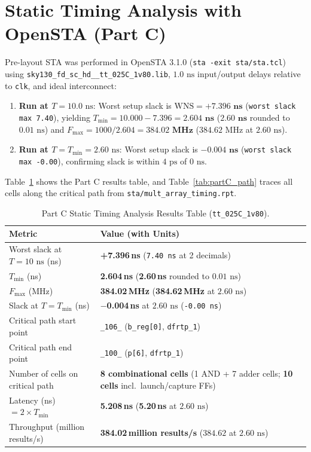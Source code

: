\documentclass[conference,10pt]{IEEEtran}
\begin{document}
\section{Static Timing Analysis with OpenSTA (Part C)}
Pre-layout STA was performed in OpenSTA 3.1.0 (\texttt{sta -exit sta/sta.tcl}) using \texttt{sky130\_fd\_sc\_hd\_\_tt\_025C\_1v80.lib}, $1.0\text{ ns}$ input/output delays relative to \texttt{clk}, and ideal interconnect:
\begin{enumerate}
    \item \textbf{Run at $T = 10.0\text{ ns}$}: Worst setup slack is $\text{WNS} = \mathbf{+7.396\text{ ns}}$ (\texttt{worst slack max 7.40}), yielding $T_{\min} = 10.000 - 7.396 = \mathbf{2.604\text{ ns}}$ ($\mathbf{2.60\text{ ns}}$ rounded to $0.01\text{ ns}$) and $F_{\max} = 1000 / 2.604 = \mathbf{384.02\text{ MHz}}$ ($384.62\text{ MHz}$ at $2.60\text{ ns}$).
    \item \textbf{Run at $T = T_{\min} = 2.60\text{ ns}$}: Worst setup slack is $\mathbf{-0.004\text{ ns}}$ (\texttt{worst slack max -0.00}), confirming slack is within $4\text{ ps}$ of $0\text{ ns}$.
\end{enumerate}
Table~\ref{tab:partC_summary} shows the Part C results table, and Table~\ref{tab:partC_path} traces all cells along the critical path from \texttt{sta/mult\_array\_timing.rpt}.

\begin{table}[!t]
    \centering
    \caption{Part C Static Timing Analysis Results Table (\texttt{tt\_025C\_1v80}).}
    \label{tab:partC_summary}
    \footnotesize
    \begin{tabularx}{\columnwidth}{@{}l X@{}}
        \toprule
        \textbf{Metric} & \textbf{Value (with Units)} \\
        \midrule
        Worst slack at $T = 10\text{ ns}$ (ns) & \textbf{+7.396\,ns} (\texttt{7.40\,ns} at 2 decimals) \\
        $T_{\min}$ (ns) & \textbf{2.604\,ns} (\textbf{2.60\,ns} rounded to $0.01\text{ ns}$) \\
        $F_{\max}$ (MHz) & \textbf{384.02\,MHz} (\textbf{384.62\,MHz} at $2.60\text{ ns}$) \\
        Slack at $T = T_{\min}$ (ns) & \textbf{$-$0.004\,ns} at $2.60\text{ ns}$ (\texttt{-0.00\,ns}) \\
        Critical path start point & \texttt{\_106\_} (\texttt{b\_reg[0]}, \texttt{dfrtp\_1}) \\
        Critical path end point & \texttt{\_100\_} (\texttt{p[6]}, \texttt{dfrtp\_1}) \\
        Number of cells on critical path & \textbf{8 combinational cells} (1 AND + 7 adder cells; \textbf{10 cells} incl.\ launch/capture FFs) \\
        Latency (ns) $= 2 \times T_{\min}$ & \textbf{5.208\,ns} (\textbf{5.20\,ns} at $2.60\text{ ns}$) \\
        Throughput (million results/s) & \textbf{384.02\,million results/s} ($384.62$ at $2.60\text{ ns}$) \\
        \bottomrule
    \end{tabularx}
\end{table}
\end{document}
